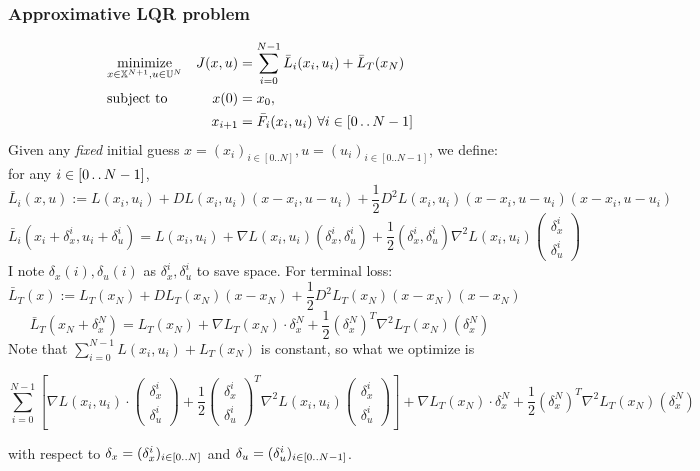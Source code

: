 \documentclass{report}
\newcommand{\twodots}{\mathinner {\ldotp \ldotp}}
\begin{document}
\subsubsection{Approximative LQR problem}
\begin{equation}
\begin{aligned}
&\underset{x \in \mathbb{X}^{N+1}, u \in \mathbb{U}^N}{\text{minimize}}          &J(x, u) &=\sum_{i = 0}^{N-1} \bar{L}_i(x_i, u_i) + \bar{L}_T(x_N) \\
&\text{subject to}       &x(0)      &= x_0,  \\ %
&							      &x_{i+1}  &= \bar{F}_i(x_i, u_i) 
\ \forall i \in [0 \twodots N-1]
\end{aligned}
\end{equation}
Given any \emph{fixed} initial guess $x =(x_i)_{i \in [0 .. N]}, u = (u_i)_{i \in [0 .. N-1]}$, we define: for any $i \in [0 \twodots N-1]$,
\[
\bar{L}_i(x, u) := L(x_i, u_i) + DL(x_i, u_i)(x - x_i, u -u_i) + \frac{1}{2} D^2L(x_i, u_i)(x - x_i, u -u_i)(x - x_i, u -u_i)
\]
\begin{equation}
\bar{L}_i(x_i + \delta_x^i, u_i + \delta_u^i) =  L(x_i, u_i) + \nabla L(x_i, u_i) (\delta_x^i, \delta_u^i) + \frac{1}{2} (\delta_x^i, \delta_u^i) \nabla^2 L(x_i, u_i)
\begin{pmatrix}
\delta_x^i \\
\delta_u^i
\end{pmatrix}
\end{equation}
I note $\delta_x(i), \delta_u(i)$ as $\delta_x^i, \delta_u^i$ to save space. For terminal loss:
\[
\bar{L}_T(x) := L_T(x_N) + DL_T(x_N)(x - x_N) + \frac{1}{2} D^2L_T(x_N)(x - x_N)(x - x_N)
\]
\begin{equation}
\bar{L}_T(x_N + \delta_x^N) =  L_T(x_N) + \nabla L_T(x_N) \cdot \delta_x^N + \frac{1}{2} (\delta_x^N)^T \nabla^2 L_T(x_N) (\delta_x^N)
\end{equation}
Note that $\sum_{i=0}^{N-1}L(x_i, u_i) + L_T(x_N)$ is constant, so what we optimize is 
\begin{tcolorbox}
\[
\sum_{i=0}^{N-1} [\nabla L(x_i, u_i) \cdot
\begin{pmatrix}
\delta_x^i \\
\delta_u^i
\end{pmatrix} + \frac{1}{2} 
\begin{pmatrix}
\delta_x^i \\
\delta_u^i
\end{pmatrix}^T
 \nabla^2 L(x_i, u_i)
\begin{pmatrix}
\delta_x^i \\
\delta_u^i
\end{pmatrix}]
+ \nabla L_T(x_N) \cdot \delta_x^N + \frac{1}{2} (\delta_x^N)^T \nabla^2 L_T(x_N) (\delta_x^N)
\]
\end{tcolorbox}
with respect to $\delta_x = (\delta_x^i)_{i \in [0 \twodots N]}$ and $\delta_u = (\delta_u^i)_{i \in [0 \twodots N-1]}$.
\end{document}

